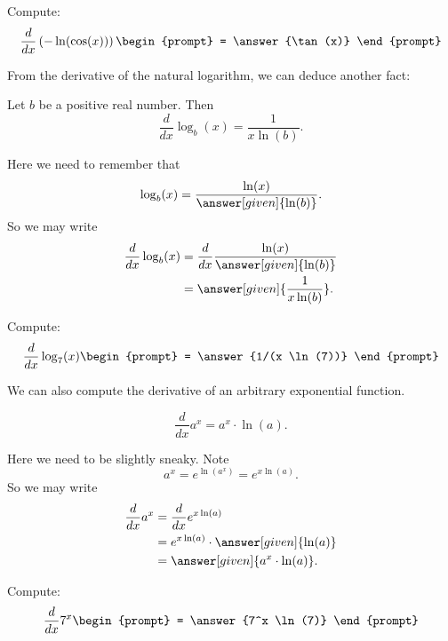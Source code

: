 \documentclass{ximera}
\begin{document}
\begin{question}
  Compute:
  \[
  \frac{d}{dx} \left(-\ln(\cos(x))\right)
  \begin{prompt}
    = \answer{\tan(x)}
  \end{prompt}
  \]
\end{question}



From the derivative of the natural logarithm, we can deduce another fact:

\begin{theorem}
  Let $b$ be a positive real number. Then
  \[
  \frac{d}{dx} \log_b(x) = \frac{1}{x\ln(b)}.
  \]
  \begin{explanation}
    Here we need to remember that
    \[
    \log_b(x) = \frac{\ln(x)}{\answer[given]{\ln(b)}}.
    \]
    So we may write
    \begin{align*}
      \frac{d}{dx} \log_b(x) &= \frac{d}{dx} \frac{\ln(x)}{\answer[given]{\ln(b)}}\\
      &= \answer[given]{\frac{1}{x\ln(b)}}.
    \end{align*}
  \end{explanation}
\end{theorem}

\begin{question}
  Compute:
  \[
  \frac{d}{dx} \log_7(x)
  \begin{prompt}
    = \answer{1/(x \ln(7))}
  \end{prompt}
  \]
\end{question}


We can also compute the derivative of an arbitrary exponential
function.

\begin{theorem}
  \[
  \frac{d}{dx} a^x = a^x\cdot \ln(a).
  \]
  \begin{explanation}
    Here we need to be slightly sneaky. Note
    \[
    a^x = e^{\ln(a^x)} = e^{x\ln(a)}.
    \]
    So we may write
    \begin{align*}
      \frac{d}{dx} a^x &= \frac{d}{dx} e^{x\ln(a)}\\
      &= e^{x\ln(a)} \cdot \answer[given]{\ln(a)}\\
      &= \answer[given]{a^x\cdot \ln(a)}.
    \end{align*}
  \end{explanation}
\end{theorem}

\begin{question}
  Compute:
  \[
  \frac{d}{dx} 7^x
  \begin{prompt}
    = \answer{7^x \ln(7)}
  \end{prompt}
  \]
\end{question}
\end{document}
